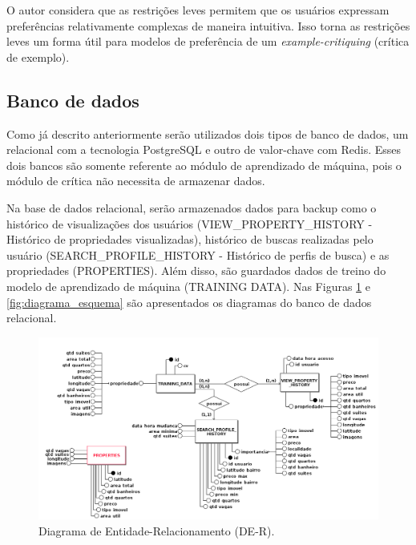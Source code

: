 O autor considera que as restrições leves permitem que os usuários expressam preferências relativamente complexas de maneira intuitiva. Isso torna as restrições leves um forma útil para modelos de preferência de um \textit{example-critiquing} (crítica de exemplo).

\subsection{Banco de dados}

Como já descrito anteriormente serão utilizados dois tipos de banco de dados, um relacional com a tecnologia PostgreSQL e outro de valor-chave com Redis. Esses dois bancos são somente referente ao módulo de aprendizado de máquina, pois o módulo de crítica não necessita de armazenar dados.

Na base de dados relacional, serão armazenados dados para backup como o histórico de visualizações dos usuários (VIEW\_PROPERTY\_HISTORY - Histórico de propriedades visualizadas), histórico de buscas realizadas pelo usuário (SEARCH\_PROFILE\_HISTORY - Histórico de perfis de busca) e as propriedades (PROPERTIES). Além disso, são guardados dados de treino do modelo de aprendizado de máquina (TRAINING DATA).  Nas Figuras \ref{fig:der} e \ref{fig:diagrama_esquema} são apresentados os diagramas do banco de dados relacional.

\begin{figure}[H]
    \centering
    \includegraphics[scale=0.40]{figuras/proposta/der.png}
    \caption[Diagrama de Entidade-Relacionamento (DE-R)]{Diagrama de Entidade-Relacionamento (DE-R).}
    \label{fig:der}
\end{figure}

